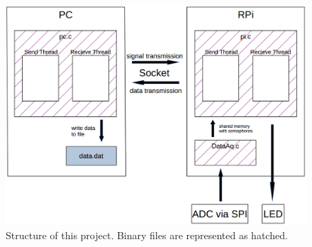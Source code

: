 \documentclass[12pt,paper=a4,twoside]{scrartcl}
\numberwithin{equation}{section}
\begin{document}
\begin{figure}
\centering
\includegraphics[scale=0.4]{schematic.png}
\caption{Structure of this project. Binary files are represented as hatched.}
\label{schematic}
\end{figure}
\end{document}
